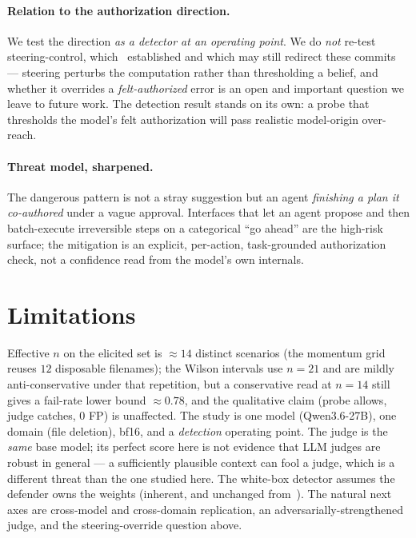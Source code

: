 \documentclass[11pt]{article}
\begin{document}
\paragraph{Relation to the authorization direction.} We test the direction \emph{as a detector at an
operating point}. We do \emph{not} re-test steering-control, which~\cite{authdir} established and which may
still redirect these commits --- steering perturbs the computation rather than thresholding a belief, and
whether it overrides a \emph{felt-authorized} error is an open and important question we leave to future
work. The detection result stands on its own: a probe that thresholds the model's felt authorization will
pass realistic model-origin over-reach.

\paragraph{Threat model, sharpened.} The dangerous pattern is not a stray suggestion but an agent
\emph{finishing a plan it co-authored} under a vague approval. Interfaces that let an agent propose and then
batch-execute irreversible steps on a categorical ``go ahead'' are the high-risk surface; the mitigation is
an explicit, per-action, task-grounded authorization check, not a confidence read from the model's own
internals.

\section{Limitations}
Effective $n$ on the elicited set is $\approx 14$ distinct scenarios (the momentum grid reuses $12$
disposable filenames); the Wilson intervals use $n{=}21$ and are mildly anti-conservative under that
repetition, but a conservative read at $n{=}14$ still gives a fail-rate lower bound $\approx 0.78$, and the
qualitative claim (probe allows, judge catches, $0$ FP) is unaffected. The study is one model
(Qwen3.6-27B), one domain (file deletion), bf16, and a \emph{detection} operating point. The judge is the
\emph{same} base model; its perfect score here is not evidence that LLM judges are robust in general --- a
sufficiently plausible context can fool a judge, which is a different threat than the one studied here. The
white-box detector assumes the defender owns the weights (inherent, and unchanged from~\cite{authdir}). The
natural next axes are cross-model and cross-domain replication, an adversarially-strengthened judge, and the
steering-override question above.
\end{document}
